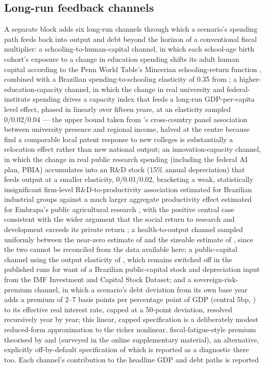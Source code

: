 \documentclass[11pt,a4paper]{article}
\begin{document}
\subsection{Long-run feedback channels}

A separate block adds six long-run channels through which a scenario's spending path feeds back into output and debt beyond the horizon of a conventional fiscal multiplier: a schooling-to-human-capital channel, in which each school-age birth cohort's exposure to a change in education spending shifts its adult human capital according to the Penn World Table's Mincerian schooling-return function \citep{pwt1001human}, combined with a Brazilian spending-to-schooling elasticity of 0.35 from \citet{litschig2013,litschig2012}; a higher-education-capacity channel, in which the change in real university and federal-institute spending drives a capacity index that feeds a long-run GDP-per-capita level effect, phased in linearly over fifteen years, at an elasticity sampled 0/0.02/0.04 --- the upper bound taken from \citet{valerovanreenen2019}'s cross-country panel association between university presence and regional income, halved at the centre because \citet{andrews2023} find a comparable local patent response to new colleges is substantially a relocation effect rather than new national output; an innovation-capacity channel, in which the change in real public research spending (including the federal AI plan, PBIA) accumulates into an R\&D stock (15\% annual depreciation) that feeds output at a smaller elasticity, 0/0.01/0.02, bracketing a weak, statistically insignificant firm-level R\&D-to-productivity association estimated for Brazilian industrial groups \citep{alcantarakannebley2024} against a much larger aggregate productivity effect estimated for Embrapa's public agricultural research \citep{akermanetal2025}, with the positive central case consistent with the wider argument that the social return to research and development exceeds its private return \citep{joneswilliams1998}; a health-to-output channel sampled uniformly between the near-zero estimate of \citet{acemoglujohnson2007} and the sizeable estimate of \citet{bloomcanningsevilla2001}, since the two cannot be reconciled from the data available here; a public-capital channel using the output elasticity of \citet{bomligthart2014}, which remains switched off in the published runs for want of a Brazilian public-capital stock and depreciation input from the IMF Investment and Capital Stock Dataset; and a sovereign-risk-premium channel\label{sec:architecture.premium}, in which a scenario's debt deviation from its own base year adds a premium of 2--7 basis points per percentage point of GDP (central 5bp, \citealp{baldaccikumar2010}) to its effective real interest rate, capped at a 50-point deviation, resolved recursively year by year; this linear, capped specification is a deliberately modest reduced-form approximation to the richer nonlinear, fiscal-fatigue-style premium theorised by \citet{ghoshkimmendozaostryqureshi2013} and \citet{bi2012} (surveyed in the online supplementary material), an alternative, explicitly off-by-default specification of which is reported as a diagnostic there too. Each channel's contribution to the headline GDP and debt paths is reported 
\end{document}
